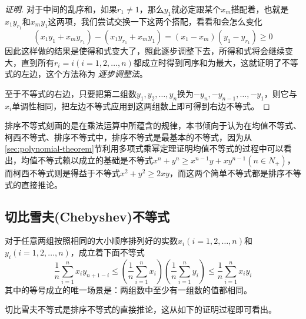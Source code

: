 \begin{proof}[证明]
  对于中间的乱序和，如果$r_1 \neq 1$，那么$y_1$就必定跟某个$x_m$搭配着，也就是$x_1y_{r_1}$和$x_my_1$这两项，我们尝试交换一下这两个搭配，看看和会怎么变化
  \begin{equation*}
    (x_1y_1+x_my_{r_1})-(x_1y_{r_1}+x_my_1) = (x_1-x_m)(y_1-y_{r_1}) \geqslant 0
  \end{equation*}
  因此这样做的结果是使得和式变大了，照此逐步调整下去，所得和式将会继续变大，直到所有$r_i=i(i=1,2,\ldots,n)$都成立时得到同序和为最大，这就证明了不等式的左边，这个方法称为 \emph{逐步调整法}。

  至于不等式的右边，只要把第二组数$y_1,y_2,\ldots,y_n$换为$-y_n,-y_{n-1},\ldots,-y_1$，则它与$x_i$单调性相同，把左边不等式应用到这两组数上即可得到右边不等式。
\end{proof}

排序不等式刻画的是在乘法运算中所蕴含的规律，本书倾向于认为在均值不等式、柯西不等式、排序不等式中，排序不等式是最基本的不等式，因为从\ref{sec:polynomial-theorem}节利用多项式乘幂定理证明均值不等式的过程中可以看出，均值不等式赖以成立的基础是不等式$x^n+y^n \geqslant x^{n-1}y+xy^{n-1}(n \in N_+)$，而柯西不等式则是得益于不等式$x^2+y^2 \geqslant 2xy$，而这两个简单不等式都是排序不等式的直接推论。

\subsection{切比雪夫(Chebyshev)不等式}

\begin{theorem}[切比雪夫不等式]
对于任意两组按照相同的大小顺序排列好的实数$x_i(i=1,2,\ldots,n)$和$y_i(i=1,2,\ldots,n)$，成立着下面不等式
\begin{equation}
  \label{eq:chebyshev-inequation}
  \frac{1}{n}\sum_{i=1}^nx_iy_{n+1-i}
  \leqslant \left( \frac{1}{n}\sum_{i=1}^nx_i \right) \left( \frac{1}{n}\sum_{i=1}^ny_i \right)
  \leqslant \frac{1}{n}\sum_{i=1}^nx_iy_i
\end{equation}
其中的等号成立的唯一场景是：两组数中至少有一组数的值都相同。
\end{theorem}

切比雪夫不等式是排序不等式的直接推论，这从如下的证明过程即可看出。

